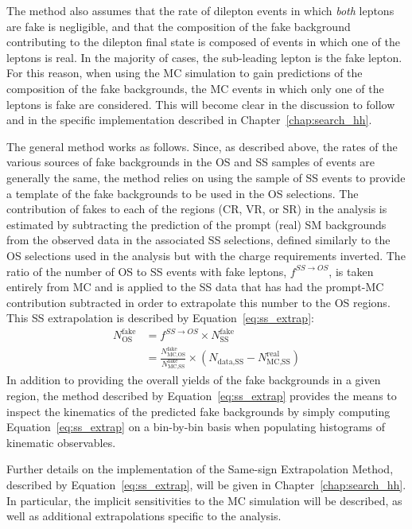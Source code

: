 The method also assumes that the rate of dilepton events in which \textit{both} leptons
are fake is negligible, and that the composition of the fake background contributing to
the dilepton final state is composed of events in which one of the leptons is real.
In the majority of cases, the sub-leading lepton is the fake lepton.
For this reason, when using the MC simulation to gain predictions of the composition of
the fake backgrounds, the MC events in which only one of the leptons is fake are considered.
This will become clear in the discussion to follow and in the specific implementation described
in Chapter~\ref{chap:search_hh}.


The general method works as follows.
Since, as described above, the rates of the various sources of fake backgrounds in the OS and SS samples of events
are generally the same, the method relies on using the sample of SS events to provide a template of the fake backgrounds
to be used in the OS selections.
The contribution of fakes to each of the regions (CR, VR, or SR) in the analysis is estimated
by subtracting the prediction of the prompt (real) SM backgrounds from the observed data
in the associated SS selections, defined similarly to the OS selections used in the analysis but with the
charge requirements inverted.
The ratio of the number of OS to SS events with fake leptons, $f^{SS \rightarrow OS}$,
is taken entirely from MC and is applied to the SS data that has had the prompt-MC contribution
subtracted in order to extrapolate this number to the OS regions.
This SS extrapolation is described by Equation~\ref{eq:ss_extrap}:
\begin{align}
    N_{\text{OS}}^{\text{fake}} &= f^{SS \rightarrow OS} \times N_{\text{SS}}^{\text{fake}} \nonumber \\
        &= \frac{ N_{\text{MC,OS}}^{\text{fake}} }{ N_{\text{MC,SS}}^{\text{fake}} } \times ( N_{\text{data,SS}} - N_{\text{MC,SS}}^{\text{real}} )
        \label{eq:ss_extrap}
\end{align}
In addition to providing the overall yields of the fake backgrounds in a given region,
the method described by Equation~\ref{eq:ss_extrap} provides the means to
inspect the kinematics of the predicted fake backgrounds by simply computing
Equation~\ref{eq:ss_extrap} on a bin-by-bin basis when populating histograms
of kinematic observables.

Further details on the implementation of the Same-sign Extrapolation Method,
described by Equation~\ref{eq:ss_extrap}, will be given in Chapter~\ref{chap:search_hh}.
In particular, the implicit sensitivities to the MC simulation will be described,
as well as additional extrapolations specific to the analysis.
